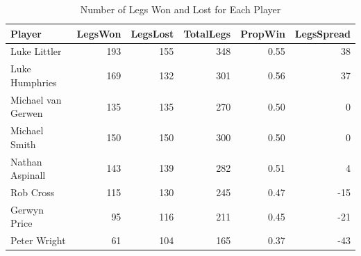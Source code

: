 \documentclass[
]{article}
\begin{document}
\normalsize

\scriptsize

{

\begin{longtable}[]{@{}lrrrrr@{}}

\caption{\label{tbl-playerstats}Number of Legs Won and Lost for Each
Player}

\tabularnewline

\toprule\noalign{}
Player & LegsWon & LegsLost & TotalLegs & PropWin & LegsSpread \\
\midrule\noalign{}
\endhead
\bottomrule\noalign{}
\endlastfoot
Luke Littler & 193 & 155 & 348 & 0.55 & 38 \\
Luke Humphries & 169 & 132 & 301 & 0.56 & 37 \\
Michael van Gerwen & 135 & 135 & 270 & 0.50 & 0 \\
Michael Smith & 150 & 150 & 300 & 0.50 & 0 \\
Nathan Aspinall & 143 & 139 & 282 & 0.51 & 4 \\
Rob Cross & 115 & 130 & 245 & 0.47 & -15 \\
Gerwyn Price & 95 & 116 & 211 & 0.45 & -21 \\
Peter Wright & 61 & 104 & 165 & 0.37 & -43 \\

\end{longtable}

}

\normalsize

\scriptsize
\end{document}
